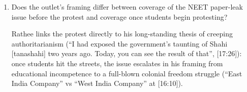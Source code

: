 \documentclass[10pt,a4paper]{article}
\begin{document}
{\begin{enumerate}[leftmargin=1.5em, itemsep=6pt, topsep=4pt]
  \textbf{Hybrid narrator-led documentary:} Rathee's scripted voiceover drives the chronological investigation, punctuated by short, emotionally intense ground-video clips of protesters, doctors (``We are doctors! We came to help you... They beat us up'', [11:26]), citizens confronting unbadged police (``Where is your tag? Where is your nameplate?'', [11:37--12:25]), and assaulted YouTubers ([12:58--13:25]).
  \item Does the outlet's framing differ between coverage of the NEET paper-leak issue before the protest and coverage once students begin protesting?\par\smallskip
  Rathee links the protest directly to his long-standing thesis of creeping authoritarianism (``I had exposed the government's taunting of Shahi [tanashahi] two years ago. Today, you can see the result of that'', [17:26]): once students hit the streets, the issue escalates in his framing from educational incompetence to a full-blown colonial freedom struggle (``East India Company'' vs ``West India Company'' at [16:10]).
\end{enumerate}
}
\end{document}
